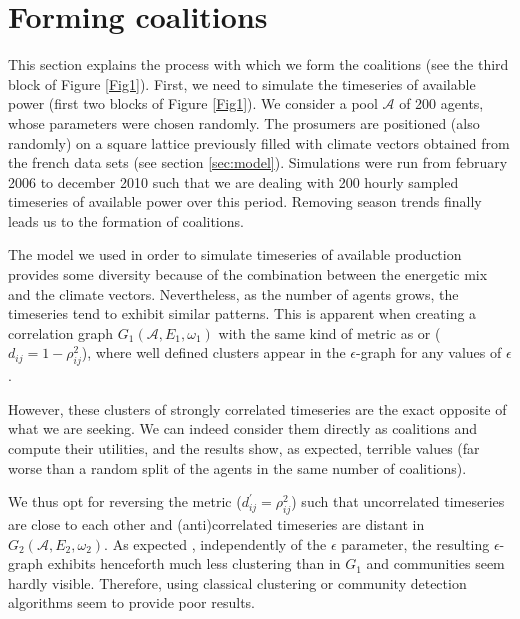 \documentclass[conference]{IEEEtran}
\begin{document}
\section{Forming coalitions}
\label{sec:forming}

This section explains the process with which we form the coalitions (see the third block of Figure \ref{Fig1}). First, we need to simulate the timeseries of available power (first two blocks of Figure \ref{Fig1}). We consider a pool $ \mathcal{A} $ of 200 agents, whose parameters were chosen randomly. The prosumers are positioned (also randomly) on a square lattice previously filled with climate vectors obtained from the french data sets (see section \ref{sec:model}). Simulations were run from february 2006 to december 2010 such that we are dealing with 200 hourly sampled timeseries of available power over this period. Removing season trends finally leads us to the formation of coalitions. 

The model we used in order to simulate timeseries of available production provides some diversity because of the combination between the energetic mix and the climate vectors. Nevertheless, as the number of agents grows, the timeseries tend to exhibit similar patterns. This is apparent when creating a correlation graph $ G_{1}(\mathcal{A},E_{1},\omega_{1}) $ with the same kind of metric as \cite{Garas2008} or \cite{Onnela2004} ($ d_{ij} = 1 - \rho_{ij}^{2} $), where well defined clusters appear in the $ \epsilon $-graph for any values of $ \epsilon $. 

However, these clusters of strongly correlated timeseries are the exact opposite of what we are seeking. We can indeed consider them directly as coalitions and compute their utilities, and the results show, as expected, terrible values (far worse than a random split of the agents in the same number of coalitions).

We thus opt for reversing the metric ($ d_{ij}^{'} = \rho_{ij}^{2} $) such that uncorrelated timeseries are close to each other and (anti)correlated timeseries are distant in $ G_{2}(\mathcal{A},E_{2},\omega_{2}) $. As expected \cite{Onnela2004}, independently of the $ \epsilon $ parameter, the resulting $ \epsilon $-graph exhibits henceforth much less clustering than in $ G_{1} $ and communities seem hardly visible. Therefore, using classical clustering or community detection algorithms seem to provide poor results. 
\end{document}
